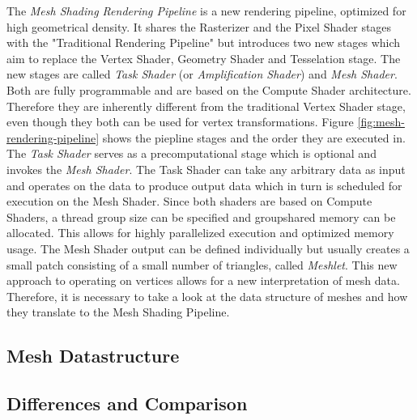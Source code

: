 The \emph{Mesh Shading Rendering Pipeline} is a new rendering pipeline, optimized for high geometrical 
density. It shares the Rasterizer and the Pixel Shader stages with the "Traditional Rendering Pipeline" but 
introduces two new stages which aim to replace the Vertex Shader, Geometry Shader and Tesselation stage.
The new stages are called \emph{Task Shader} (or \emph{Amplification Shader}) and \emph{Mesh Shader}. Both 
are fully programmable and are based on the Compute Shader architecture. Therefore they are inherently different 
from the traditional Vertex Shader stage, even though they both can be used for vertex transformations.
Figure \ref{fig:mesh-rendering-pipeline} shows the piepline stages and the order they are executed in. \\

\noindent
The \emph{Task Shader} serves as a precomputational stage which is optional and invokes the \emph{Mesh Shader}.
The Task Shader can take any arbitrary data as input and operates on the data to produce output data which in 
turn is scheduled for execution on the Mesh Shader. Since both shaders are based on Compute Shaders, a thread 
group size can be specified and groupshared memory can be allocated. This allows for highly parallelized execution 
and optimized memory usage. The Mesh Shader output can be defined individually but usually creates a small patch 
consisting of a small number of triangles, called \emph{Meshlet}. This new approach to operating on vertices 
allows for a new interpretation of mesh data. Therefore, it is necessary to take a look at the data structure of 
meshes and how they translate to the Mesh Shading Pipeline. 

\subsection{Mesh Datastructure} \label{subsec-mesh-datastructure}








\subsection{Differences and Comparison} \label{sec-differences-and-comparison}

